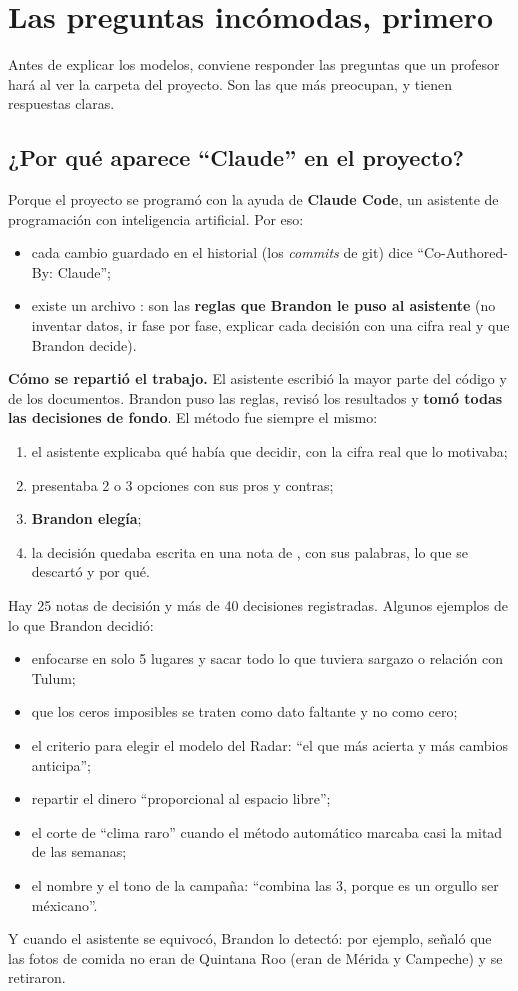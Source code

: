 \chapter{Las preguntas incómodas, primero}
\label{cap:s-incomodas}
Antes de explicar los modelos, conviene responder las preguntas que un profesor hará al ver la carpeta del proyecto. Son
las que más preocupan, y tienen respuestas claras.

\section{¿Por qué aparece ``Claude'' en el proyecto?}
Porque el proyecto se programó con la ayuda de \textbf{Claude Code}, un asistente de programación con inteligencia
artificial. Por eso:
\begin{itemize}
\item cada cambio guardado en el historial (los \emph{commits} de git) dice ``Co-Authored-By: Claude'';
\item existe un archivo : son las \textbf{reglas que Brandon le puso al asistente} (no inventar datos,
  ir fase por fase, explicar cada decisión con una cifra real y que Brandon decide).
\end{itemize}

\textbf{Cómo se repartió el trabajo.} El asistente escribió la mayor parte del código y de los documentos. Brandon puso las
reglas, revisó los resultados y \textbf{tomó todas las decisiones de fondo}. El método fue siempre el mismo:
\begin{enumerate}
\item el asistente explicaba qué había que decidir, con la cifra real que lo motivaba;
\item presentaba 2 o 3 opciones con sus pros y contras;
\item \textbf{Brandon elegía};
\item la decisión quedaba escrita en una nota de , con sus palabras, lo que se descartó y por qué.
\end{enumerate}
Hay 25 notas de decisión y más de 40 decisiones registradas. Algunos ejemplos de lo que Brandon decidió:
\begin{itemize}
\item enfocarse en solo 5 lugares y sacar todo lo que tuviera sargazo o relación con Tulum;
\item que los ceros imposibles se traten como dato faltante y no como cero;
\item el criterio para elegir el modelo del Radar: ``el que más acierta y más cambios anticipa'';
\item repartir el dinero ``proporcional al espacio libre'';
\item el corte de ``clima raro'' cuando el método automático marcaba casi la mitad de las semanas;
\item el nombre y el tono de la campaña: ``combina las 3, porque es un orgullo ser méxicano''.
\end{itemize}
Y cuando el asistente se equivocó, Brandon lo detectó: por ejemplo, señaló que las fotos de comida no eran de Quintana Roo
(eran de Mérida y Campeche) y se retiraron.


